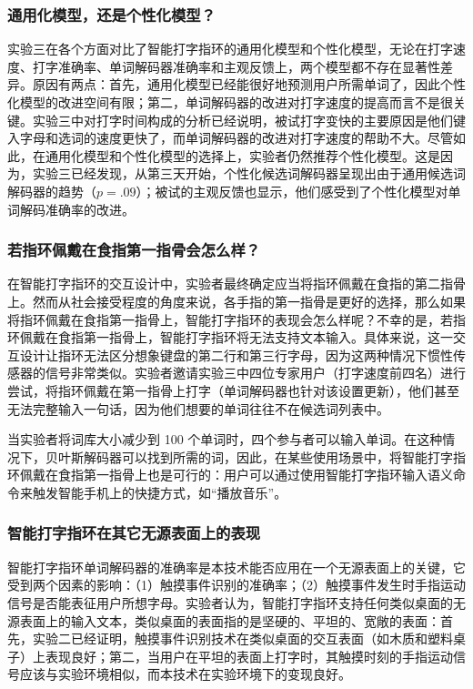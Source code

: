 \subsubsection{通用化模型，还是个性化模型？}

实验三在各个方面对比了智能打字指环的通用化模型和个性化模型，无论在打字速度、打字准确率、单词解码器准确率和主观反馈上，两个模型都不存在显著性差异。原因有两点：首先，通用化模型已经能很好地预测用户所需单词了，因此个性化模型的改进空间有限；第二，单词解码器的改进对打字速度的提高而言不是很关键。实验三中对打字时间构成的分析已经说明，被试打字变快的主要原因是他们键入字母和选词的速度更快了，而单词解码器的改进对打字速度的帮助不大。尽管如此，在通用化模型和个性化模型的选择上，实验者仍然推荐个性化模型。这是因为，实验三已经发现，从第三天开始，个性化候选词解码器呈现出由于通用候选词解码器的趋势（$p=.09$）；被试的主观反馈也显示，他们感受到了个性化模型对单词解码准确率的改进。

\subsubsection{若指环佩戴在食指第一指骨会怎么样？}

在智能打字指环的交互设计中，实验者最终确定应当将指环佩戴在食指的第二指骨上。然而从社会接受程度的角度来说，各手指的第一指骨是更好的选择\cite{gu2019accurate}，那么如果将指环佩戴在食指第一指骨上，智能打字指环的表现会怎么样呢？不幸的是，若指环佩戴在食指第一指骨上，智能打字指环将无法支持文本输入。具体来说，这一交互设计让指环无法区分想象键盘的第二行和第三行字母，因为这两种情况下惯性传感器的信号非常类似。实验者邀请实验三中四位专家用户（打字速度前四名）进行尝试，将指环佩戴在第一指骨上打字（单词解码器也针对该设置更新），他们甚至无法完整输入一句话，因为他们想要的单词往往不在候选词列表中。

当实验者将词库大小减少到 100 个单词时，四个参与者可以输入单词。在这种情况下，贝叶斯解码器可以找到所需的词，因此，在某些使用场景中，将智能打字指环佩戴在食指第一指骨上也是可行的：用户可以通过使用智能打字指环输入语义命令来触发智能手机上的快捷方式，如“播放音乐”。

\subsubsection{智能打字指环在其它无源表面上的表现}

智能打字指环单词解码器的准确率是本技术能否应用在一个无源表面上的关键，它受到两个因素的影响：（1）触摸事件识别的准确率；（2）触摸事件发生时手指运动信号是否能表征用户所想字母。实验者认为，智能打字指环支持任何类似桌面的无源表面上的输入文本，类似桌面的表面指的是坚硬的、平坦的、宽敞的表面：首先，实验二已经证明，触摸事件识别技术在类似桌面的交互表面（如木质和塑料桌子）上表现良好；第二，当用户在平坦的表面上打字时，其触摸时刻的手指运动信号应该与实验环境相似，而本技术在实验环境下的变现良好。

